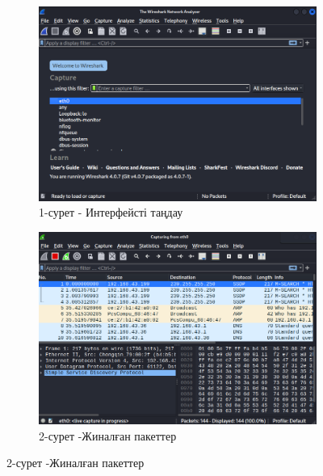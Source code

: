 \begin{figure}[H]
    \centering
    \begin{subfigure}[b]{0.45\textwidth}
        \centering
        \includegraphics[width=\linewidth]{assets/26}
        \caption*{1-сурет - Интерфейсті таңдау}
    \end{subfigure}\hfill
    \begin{subfigure}[b]{0.45\textwidth}
        \centering
        \includegraphics[width=\linewidth]{assets/27}
        \caption*{2-сурет -Жиналған пакеттер}
    \end{subfigure}
\end{figure}

